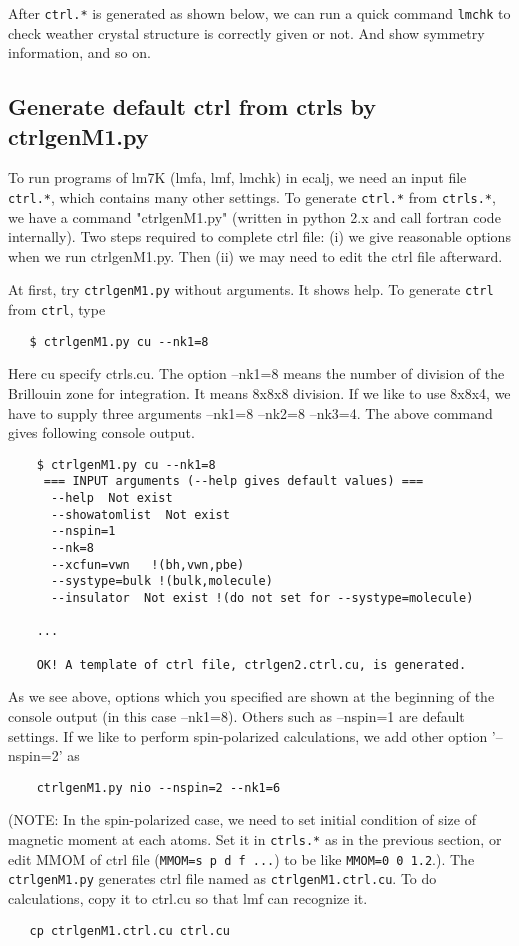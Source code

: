 \documentclass[a4paper,10pt,epsf,fleqn]{article}
\begin{document}
After \verb+ctrl.*+ is generated as shown below, 
we can run a quick command \verb+lmchk+ to check weather crystal
structure is correctly given or not. And show symmetry information, and
so on.
 
\subsection{Generate default ctrl from ctrls by ctrlgenM1.py}
To run programs of lm7K (lmfa, lmf, lmchk) in ecalj,
we need an input file \verb+ctrl.*+, which contains many other settings.
To generate \verb+ctrl.*+ from \verb+ctrls.*+, we have a command "ctrlgenM1.py" (written
in python 2.x and call fortran code internally).
Two steps required to complete ctrl file:
(i) we give reasonable options when we run ctrlgenM1.py. 
Then (ii) we may need to edit the ctrl file afterward.

At first, try \verb+ctrlgenM1.py+ without arguments. It shows help. 
To generate \verb+ctrl+ from \verb+ctrl+, type
\begin{verbatim}
   $ ctrlgenM1.py cu --nk1=8
\end{verbatim}
Here cu specify ctrls.cu. The option --nk1=8 
means the number of division of the Brillouin zone for
integration. It means 8x8x8 division. If we like to use 8x8x4, 
we have to supply three arguments --nk1=8 --nk2=8 --nk3=4.
The above command gives following console output.
\begin{verbatim}
    $ ctrlgenM1.py cu --nk1=8
     === INPUT arguments (--help gives default values) === 
      --help  Not exist
      --showatomlist  Not exist
      --nspin=1
      --nk=8
      --xcfun=vwn   !(bh,vwn,pbe) 
      --systype=bulk !(bulk,molecule)
      --insulator  Not exist !(do not set for --systype=molecule)

    ...

    OK! A template of ctrl file, ctrlgen2.ctrl.cu, is generated.
\end{verbatim}
As we see above, 
options which you specified are shown at the beginning of the console output
(in this case --nk1=8). Others such as --nspin=1 are default settings.
If we like to perform spin-polarized calculations, we add other option
'--nspin=2' as
\begin{verbatim}
    ctrlgenM1.py nio --nspin=2 --nk1=6
\end{verbatim}
(NOTE: In the spin-polarized case, we need to set initial condition of size of
magnetic moment at each atoms. Set it in \verb+ctrls.*+ as in the
previous section, or edit MMOM of ctrl file (\verb+MMOM=s p d f ...+) to be like
\verb+MMOM=0 0 1.2+.). The \verb+ctrlgenM1.py+ generates ctrl file named as
\verb+ctrlgenM1.ctrl.cu+. To do calculations, copy it to ctrl.cu so 
that lmf can recognize it.
\begin{verbatim}
   cp ctrlgenM1.ctrl.cu ctrl.cu
\end{verbatim}
\end{document}
